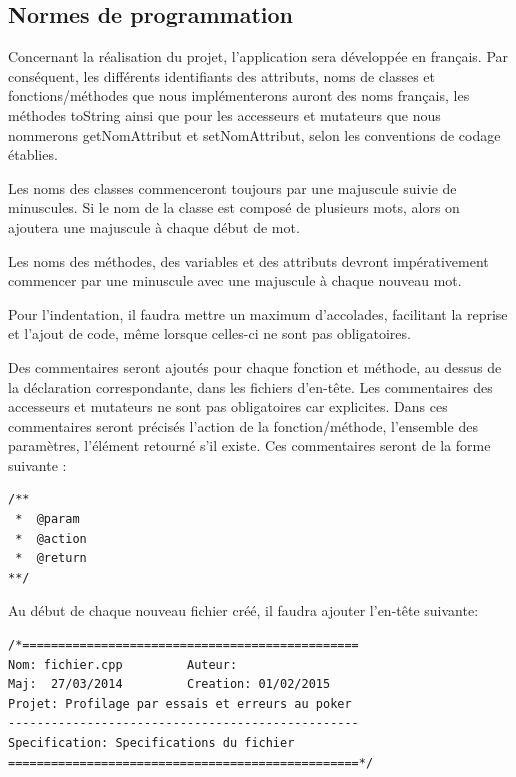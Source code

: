 \documentclass{report}
\begin{document}
\subsection{Normes de programmation}
\hspace{0.5cm}Concernant la réalisation du projet, l'application sera développée en français. Par conséquent, les différents identifiants des attributs, noms de classes et fonctions/méthodes que nous implémenterons auront des noms français, les méthodes toString ainsi que pour les accesseurs et mutateurs que nous nommerons getNomAttribut et setNomAttribut, selon les conventions de codage établies.\par

Les noms des classes commenceront toujours par une majuscule suivie de minuscules. Si le nom de la classe est composé de plusieurs mots, alors on ajoutera une majuscule à chaque début de mot.\par

Les noms des méthodes, des variables et des attributs devront impérativement commencer par une minuscule avec une majuscule à chaque nouveau mot.\par

Pour l'indentation, il faudra mettre un maximum d'accolades, facilitant la reprise et l'ajout de code, même lorsque celles-ci ne sont pas obligatoires.\par

Des commentaires seront ajoutés pour chaque fonction et méthode, au dessus de la déclaration correspondante, dans les fichiers d'en-tête. Les commentaires des accesseurs et mutateurs ne sont pas obligatoires car explicites.
Dans ces commentaires seront précisés l'action de la fonction/méthode, l'ensemble des paramètres, l'élément retourné s'il existe. Ces commentaires seront de la forme suivante : \par

\begin{lstlisting}
/**
 *  @param
 *  @action
 *  @return
**/
\end{lstlisting}

\newpage

Au début de chaque nouveau fichier créé, il faudra ajouter l'en-tête suivante: 
\begin{lstlisting}
/*===============================================
Nom: fichier.cpp         Auteur: 
Maj:  27/03/2014         Creation: 01/02/2015
Projet: Profilage par essais et erreurs au poker
-------------------------------------------------
Specification: Specifications du fichier
=================================================*/
\end{lstlisting}
\end{document}
